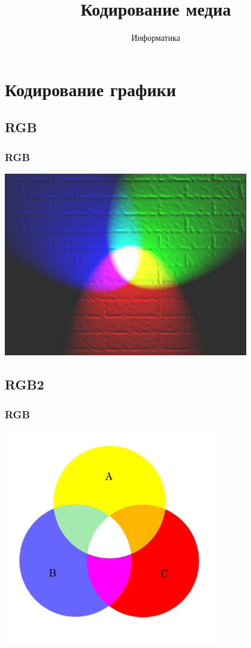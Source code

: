 \documentclass[compress,red]{beamer}
\title{Кодирование медиа}
\author{Информатика}
\begin{document}
\maketitle

\section{Кодирование графики}

\subsection{RGB}
\begin{frame}
  \frametitle{RGB}
  \centerline{\includegraphics[width=0.8\textwidth]{images/RGB_illumination.jpeg}}
\end{frame}

\subsection{RGB2}
\begin{frame}
  \frametitle{RGB}
  \centerline{\includegraphics[width=0.7\textwidth]{images/RGB.png}}
\end{frame}
\end{document}
